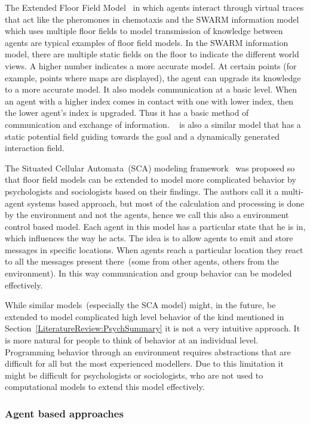 The Extended Floor Field Model~\cite{nishinari2004extended} in which agents interact through virtual traces that act like the pheromones in chemotaxis and the SWARM information model~\cite{Henein:2006jq} which uses multiple floor fields to model transmission of knowledge between agents are typical examples of floor field models. In the SWARM information model, there are multiple static fields on the floor to indicate the different world views. A higher number indicates a more accurate model. At certain points (for example, points where maps are displayed), the agent can upgrade its knowledge to a more accurate model. It also models communication at a basic level. When an agent with a higher index comes in contact with one with lower index, then the lower agent's index is upgraded. Thus it has a basic method of communication and exchange of information. ~\cite{Qi:2011kv} is also a similar model that has a static potential field guiding towards the goal and a dynamically generated interaction field.

The Situated Cellular Automata~(SCA) modeling framework~\cite{Bandini:2007fa} was proposed so that floor field models can be extended to model more complicated behavior by psychologists and sociologists based on their findings. The authors call it a multi-agent systems based approach, but most of the calculation and processing is done by the environment and not the agents, hence we call this also a environment control based model. Each agent in this model has a particular state that he is in, which influences the way he acts. The idea is to allow agents to emit and store messages in specific locations. When agents reach a particular location they react to all the messages present there~(some from other agents, others from the environment). In this way communication and group behavior can be modeled effectively.

While similar models~(especially the SCA model) might, in the future, be extended to model complicated high level behavior of the kind mentioned in Section~\ref{LiteratureReview:PsychSummary} it is not a very intuitive approach. It is more natural for people to think of behavior at an individual level. Programming behavior through an environment requires abstractions that are difficult for all but the most experienced modellers. Due to this limitation it might be difficult for psychologists or sociologists, who are not used to computational models to extend this model effectively.


\subsubsection{Agent based approaches}


